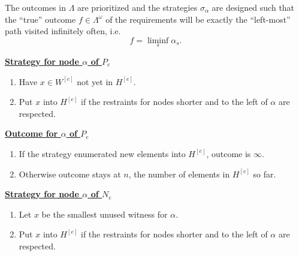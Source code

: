 The outcomes in $\Lambda$ are prioritized and the strategies
$\sigma_\alpha$ are designed such that the ``true'' outcome
$f\in\Lambda^\omega$ of the requirements will be exactly the
``left-most'' path visited infinitely often, i.e.
\[f =\liminf_s \alpha_s.\]

\underline{\textbf{Strategy for node $\alpha$ of $P_e$}}
\begin{enumerate}
  \item Have $x\in W^{[e]}$ not yet in $H^{[e]}$.
  \item Put $x$ into $H^{[e]}$ if the restraints for nodes shorter and to
    the left of $\alpha$ are respected.
\end{enumerate}

\underline{\textbf{Outcome for $\alpha$ of $P_e$}}
\begin{enumerate}
  \item If the strategy enumerated new elements into $H^{[e]}$, outcome is
    $\infty$.
  \item Otherwise outcome stays at $n$, the number of elements in $H^{[e]}$
    so far.
\end{enumerate}

\underline{\textbf{Strategy for node $\alpha$ of $N_e$}}
\begin{enumerate}
  \item Let $x$ be the smallest unused witness for $\alpha$.
  \item Put $x$ into $H^{[e]}$ if the restraints for nodes shorter and to
    the left of $\alpha$ are respected.
\end{enumerate}
